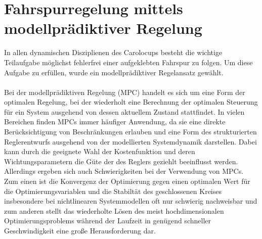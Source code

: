 \section{Fahrspurregelung mittels modellprädiktiver Regelung}
In allen dynamischen Disziplienen des Carolocups besteht die wichtige Teilaufgabe möglichst fehlerfrei einer aufgeklebten Fahrspur zu folgen. Um diese Aufgabe zu erfüllen, wurde ein modellprädiktiver Regelansatz gewählt.\\ \\ 
Bei der modellprädiktiven Regelung (MPC) handelt es sich um eine Form der optimalen Regelung, bei der wiederholt eine Berechnung der optimalen Steuerung für ein System ausgehend von dessen aktuellem Zustand stattfindet. In vielen Bereichen finden MPCs immer häufiger Anwendung, da sie eine direkte Berücksichtigung von Beschränkungen erlauben und eine Form des strukturierten Reglerentwurfs ausgehend von der modellierten Systemdynamik darstellen. Dabei kann durch die geeignete Wahl der Kostenfunktion und deren Wichtungsparametern die Güte der des Reglers geziehlt beeinflusst werden. Allerdings ergeben sich auch Schwierigkeiten bei der Verwendung von MPCs. Zum einen ist die Konvergenz der Optimierung gegen einen optimalen Wert für die Optimierungsvariablen und die Stabiltät des geschlossenen Kreises insbesondere bei nichtlinearen Systemmodellen oft nur schwierig nachweisbar und zum anderen stellt das wiederholte Lösen des meist hochdimensionalen Optimierungsproblems während der Laufzeit in genügend schneller Geschwindigkeit eine große Herausforderung dar.
\\
